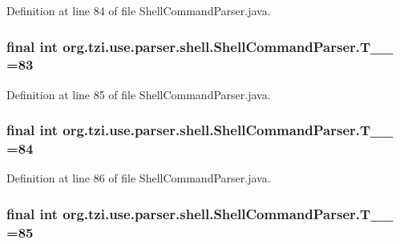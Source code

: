Definition at line 84 of file Shell\-Command\-Parser.\-java.

\hypertarget{classorg_1_1tzi_1_1use_1_1parser_1_1shell_1_1_shell_command_parser_ae76899c738579440d7587ff2a683ff52}{
\subsubsection[{T\-\_\-\-\_\-83}]{\setlength{\rightskip}{0pt plus 5cm}final int org.\-tzi.\-use.\-parser.\-shell.\-Shell\-Command\-Parser.\-T\-\_\-\-\_ =83\hspace{0.3cm}{\ttfamily [static]}}}\label{classorg_1_1tzi_1_1use_1_1parser_1_1shell_1_1_shell_command_parser_ae76899c738579440d7587ff2a683ff52}


Definition at line 85 of file Shell\-Command\-Parser.\-java.

\hypertarget{classorg_1_1tzi_1_1use_1_1parser_1_1shell_1_1_shell_command_parser_aa6a90d0e2d15c3d18e2b3df3f9fd219a}{
\subsubsection[{T\-\_\-\-\_\-84}]{\setlength{\rightskip}{0pt plus 5cm}final int org.\-tzi.\-use.\-parser.\-shell.\-Shell\-Command\-Parser.\-T\-\_\-\-\_ =84\hspace{0.3cm}{\ttfamily [static]}}}\label{classorg_1_1tzi_1_1use_1_1parser_1_1shell_1_1_shell_command_parser_aa6a90d0e2d15c3d18e2b3df3f9fd219a}


Definition at line 86 of file Shell\-Command\-Parser.\-java.

\hypertarget{classorg_1_1tzi_1_1use_1_1parser_1_1shell_1_1_shell_command_parser_a33eadcd516f779eac32b4675ffcf43f2}{
\subsubsection[{T\-\_\-\-\_\-85}]{\setlength{\rightskip}{0pt plus 5cm}final int org.\-tzi.\-use.\-parser.\-shell.\-Shell\-Command\-Parser.\-T\-\_\-\-\_ =85\hspace{0.3cm}{\ttfamily [static]}}}\label{classorg_1_1tzi_1_1use_1_1parser_1_1shell_1_1_shell_command_parser_a33eadcd516f779eac32b4675ffcf43f2}


